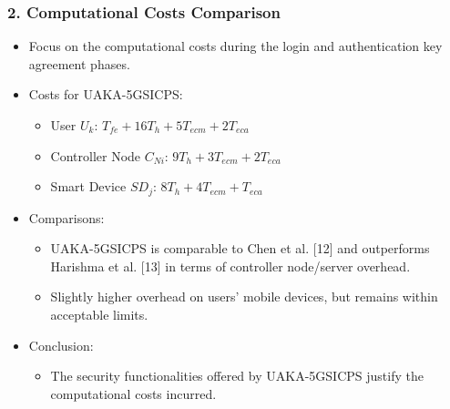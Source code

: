\documentclass[9pt,handout]{beamer}
\begin{document}
\begin{frame}
    \frametitle{2. Computational Costs Comparison}
    \begin{itemize}
        \item Focus on the computational costs during the login and authentication key agreement phases.
        \item Costs for UAKA-5GSICPS:
        \begin{itemize}
            \item User \( U_k \): \( T_{fe} + 16 T_h + 5 T_{ecm} + 2 T_{eca} \)
            \item Controller Node \( C_{Ni} \): \( 9 T_h + 3 T_{ecm} + 2 T_{eca} \)
            \item Smart Device \( SD_j \): \( 8 T_h + 4 T_{ecm} + T_{eca} \)
        \end{itemize}
        \item Comparisons:
        \begin{itemize}
            \item UAKA-5GSICPS is comparable to Chen et al. [12] and outperforms Harishma et al. [13] in terms of controller node/server overhead.
            \item Slightly higher overhead on users’ mobile devices, but remains within acceptable limits.
        \end{itemize}
        \item Conclusion:
        \begin{itemize}
            \item The security functionalities offered by UAKA-5GSICPS justify the computational costs incurred.
        \end{itemize}
    \end{itemize}
\end{frame}
\end{document}
